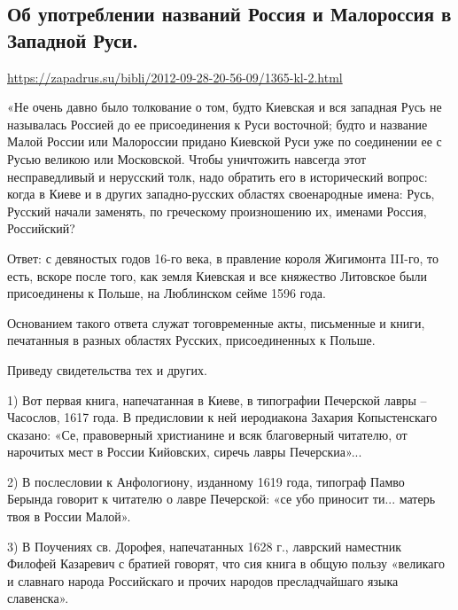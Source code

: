  
 
 
 
 

\subsection{Об употреблении названий Россия и Малороссия в Западной Руси.}
\label{sec:30_11_1867.maksimovich_ma.1.rossia_malorossia}

\url{https://zapadrus.su/bibli/2012-09-28-20-56-09/1365-kl-2.html}

«Не очень давно было толкование о том, будто Киевская и вся западная Русь не
называлась Россией до ее присоединения к Руси восточной; будто и название Малой
России или Малороссии придано Киевской Руси уже по соединении ее с Русью
великою или Московской. Чтобы уничтожить навсегда этот несправедливый и
нерусский толк, надо обратить его в исторический вопрос: когда в Киеве и в
других западно-русских областях своенародные имена: Русь, Русский начали
заменять, по греческому произношению их, именами Россия, Российский?

Ответ: с девяностых годов 16-го века, в правление короля Жигимонта III-го, то
есть, вскоре после того, как земля Киевская и все княжество Литовское были
присоединены к Польше, на Люблинском сейме 1596 года.

Основанием такого ответа служат тоговременные акты, письменные и книги,
печатанныя в разных областях Русских, присоединенных к Польше. 

Приведу свидетельства тех и других.

1) Вот первая книга, напечатанная в Киеве, в типографии Печерской лавры –
Часослов, 1617 года. В предисловии к ней иеродиакона Захария Копыстенскаго
сказано: «Се, правоверный христианине и всяк благоверный читателю, от нарочитых
мест в России Кийовских, сиречь лавры Печерскиа»...

2) В послесловии к Анфологиону, изданному 1619 года, типограф Памво Берында
говорит к читателю о лавре Печерской: «се убо приносит ти... матерь твоя в
России Малой».

3) В Поучениях св. Дорофея, напечатанных 1628 г., лаврский наместник Филофей
Казаревич с братией говорят, что сия книга в общую пользу «великаго и славнаго
народа Российскаго и прочих народов пресладчайшаго языка славенска».

